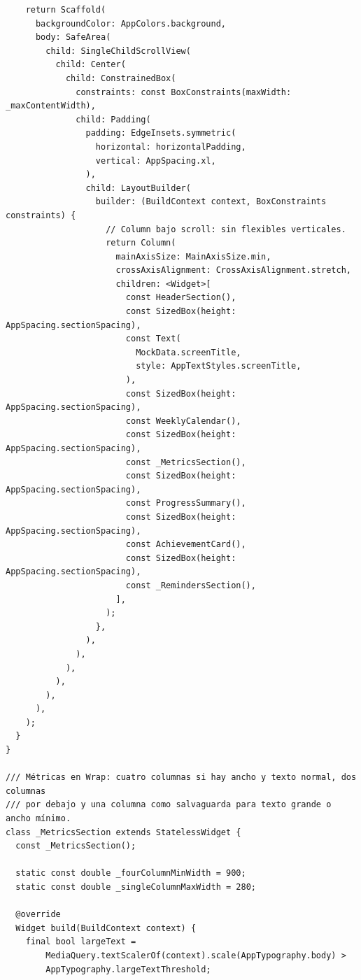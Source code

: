 \documentclass[12pt,a4paper]{article}
\begin{document}
\begin{lstlisting}
    return Scaffold(
      backgroundColor: AppColors.background,
      body: SafeArea(
        child: SingleChildScrollView(
          child: Center(
            child: ConstrainedBox(
              constraints: const BoxConstraints(maxWidth: _maxContentWidth),
              child: Padding(
                padding: EdgeInsets.symmetric(
                  horizontal: horizontalPadding,
                  vertical: AppSpacing.xl,
                ),
                child: LayoutBuilder(
                  builder: (BuildContext context, BoxConstraints constraints) {
                    // Column bajo scroll: sin flexibles verticales.
                    return Column(
                      mainAxisSize: MainAxisSize.min,
                      crossAxisAlignment: CrossAxisAlignment.stretch,
                      children: <Widget>[
                        const HeaderSection(),
                        const SizedBox(height: AppSpacing.sectionSpacing),
                        const Text(
                          MockData.screenTitle,
                          style: AppTextStyles.screenTitle,
                        ),
                        const SizedBox(height: AppSpacing.sectionSpacing),
                        const WeeklyCalendar(),
                        const SizedBox(height: AppSpacing.sectionSpacing),
                        const _MetricsSection(),
                        const SizedBox(height: AppSpacing.sectionSpacing),
                        const ProgressSummary(),
                        const SizedBox(height: AppSpacing.sectionSpacing),
                        const AchievementCard(),
                        const SizedBox(height: AppSpacing.sectionSpacing),
                        const _RemindersSection(),
                      ],
                    );
                  },
                ),
              ),
            ),
          ),
        ),
      ),
    );
  }
}

/// Métricas en Wrap: cuatro columnas si hay ancho y texto normal, dos columnas
/// por debajo y una columna como salvaguarda para texto grande o ancho mínimo.
class _MetricsSection extends StatelessWidget {
  const _MetricsSection();

  static const double _fourColumnMinWidth = 900;
  static const double _singleColumnMaxWidth = 280;

  @override
  Widget build(BuildContext context) {
    final bool largeText =
        MediaQuery.textScalerOf(context).scale(AppTypography.body) >
        AppTypography.largeTextThreshold;


\end{lstlisting}
\end{document}
